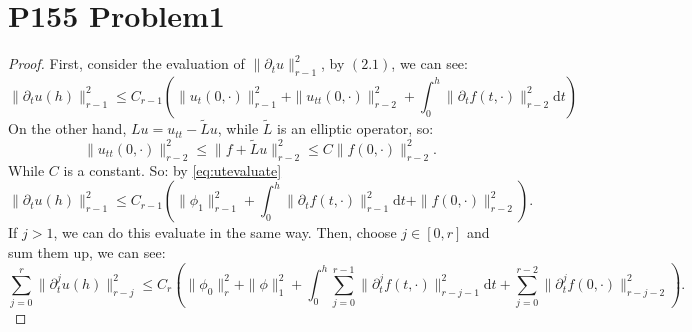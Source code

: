 \documentclass[a4paper]{ctexart}
\newcommand{\dif}{\mathrm{d}}
\begin{document}
\section*{P155 Problem1}
\begin{proof}
    First, consider the evaluation of $\|\partial_{t}u\|_{r-1}^{2}$, by $(2.1)$, we can see:
    \begin{equation}
        \label{eq:utevaluate}
        \|\partial_{t}u(h)\|_{r-1}^{2}\le C_{r-1}\left(\|u_{t}(0,\cdot)\|_{r-1}^{2}+\|u_{tt}(0,\cdot)\|_{r-2}^{2}+\int_{0}^{h}\|\partial_{t}f(t,\cdot)\|_{r-2}^{2}\dif t\right)
    \end{equation}
    On the other hand, $Lu=u_{tt}-\tilde{L}u$, while $\tilde{L}$ is an elliptic operator, so:
    \begin{equation}
        \|u_{tt}(0,\cdot)\|_{r-2}^{2}\le\|f+\tilde{L}u\|_{r-2}^{2}\le C\|f(0,\cdot)\|_{r-2}^{2}.
    \end{equation}
    While $C$ is a constant. So: by \eqref{eq:utevaluate}
    \begin{equation}
        \|\partial_{t}u(h)\|_{r-1}^{2}\le C_{r-1}(\|\phi_{1}\|_{r-1}^{2}+\int_{0}^{h}\|\partial_{t}f(t,\cdot)\|_{r-1}^{2}\dif t+\|f(0,\cdot)\|_{r-2}^{2}).
    \end{equation}
    If $j>1$, we can do this evaluate in the same way. Then, choose $j\in[0,r]$ and sum them up, we can see:
    \begin{equation}
        \sum_{j=0}^{r}\|\partial_{t}^{j}u(h)\|_{r-j}^{2}\le C_{r}\left(\|\phi_{0}\|_{r}^{2}+\|\phi\|_{1}^{2}+\int_{0}^{h}\sum_{j=0}^{r-1}\|\partial_{t}^{j}f(t,\cdot)\|_{r-j-1}^{2}\dif t+\sum_{j=0}^{r-2}\|\partial_{t}^{j}f(0,\cdot)\|_{r-j-2}^{2}\right).
    \end{equation}
\end{proof}
\end{document}
